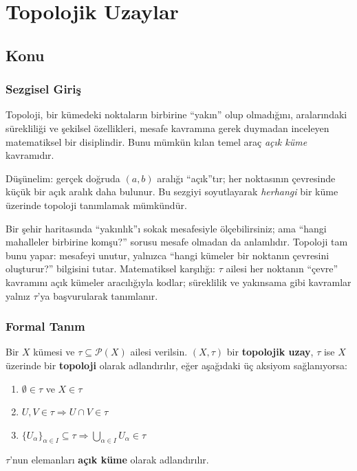 \chapter{Topolojik Uzaylar}
\label{ch:topological_spaces}

\section{Konu}

\subsection{Sezgisel Giriş}

Topoloji, bir kümedeki noktaların birbirine ``yakın'' olup olmadığını, aralarındaki
sürekliliği ve şekilsel özellikleri, mesafe kavramına gerek duymadan inceleyen matematiksel
bir disiplindir. Bunu mümkün kılan temel araç \emph{açık küme} kavramıdır.

Düşünelim: gerçek doğruda $(a, b)$ aralığı ``açık''tır; her noktasının çevresinde küçük bir
açık aralık daha bulunur. Bu sezgiyi soyutlayarak \emph{herhangi} bir küme üzerinde topoloji
tanımlamak mümkündür.

\begin{sezgi}
Bir şehir haritasında ``yakınlık''ı sokak mesafesiyle ölçebilirsiniz; ama
``hangi mahalleler birbirine komşu?'' sorusu mesafe olmadan da anlamlıdır.
Topoloji tam bunu yapar: mesafeyi unutur, yalnızca ``hangi kümeler bir
noktanın çevresini oluşturur?'' bilgisini tutar. Matematiksel karşılığı:
$\tau$ ailesi her noktanın ``çevre'' kavramını açık kümeler aracılığıyla
kodlar; süreklilik ve yakınsama gibi kavramlar yalnız $\tau$'ya
başvurularak tanımlanır.
\end{sezgi}

\subsection{Formal Tanım}

\begin{definition}
\label{def:topological_space}
Bir $X$ kümesi ve $\tau \subseteq \mathcal{P}(X)$ ailesi verilsin.
$(X, \tau)$ bir \textbf{topolojik uzay}, $\tau$ ise $X$ üzerinde bir \textbf{topoloji}
olarak adlandırılır, eğer aşağıdaki üç aksiyom sağlanıyorsa:
\begin{enumerate}
  \item[(T1)] $\emptyset \in \tau$ ve $X \in \tau$
  \item[(T2)] $U, V \in \tau \Rightarrow U \cap V \in \tau$
  \item[(T3)] $\{U_\alpha\}_{\alpha \in I} \subseteq \tau \Rightarrow
              \displaystyle\bigcup_{\alpha \in I} U_\alpha \in \tau$
\end{enumerate}
$\tau$'nun elemanları \textbf{açık küme} olarak adlandırılır.
\end{definition}

